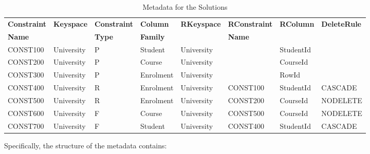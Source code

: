 \begin{table}[h] 
	\centering
	
	\begin{tabular}{CCC CCC CC}
		\toprule
		\bfseries Constraint & \bfseries Keyspace & \bfseries Constraint &
		\bfseries Column & \bfseries RKeyspace & \bfseries RConstraint &
		\bfseries RColumn & \bfseries DeleteRule\\[-6pt]
		\bfseries Name & & \bfseries Type & \bfseries Family & & \bfseries Name \\
		\midrule
		CONST100 & University & P & Student & University & & StudentId &\\
		\rc CONST200 & University & P & Course & University & & CourseId &\\
		CONST300 & University & P & Enrolment & University & & RowId &\\
		\rc CONST400 & University & R & Enrolment & University & CONST100 & StudentId
		& CASCADE\\
		CONST500 & University & R & Enrolment & University & CONST200 & CourseId &
		NODELETE\\
		\rc CONST600 & University & F & Course & University & CONST500 & CourseId &
		NODELETE\\
		CONST700 & University & F & Student & University & CONST400 & StudentId &
		CASCADE\\
		\bottomrule
	\end{tabular}
	\caption{Metadata for the Solutions}\label{fd:Metadata-Constraints}
\end{table}


Specifically, the structure of the metadata contains:

